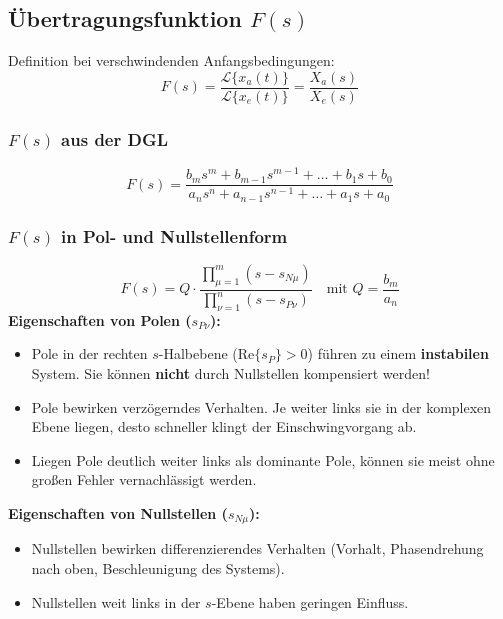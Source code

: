\subsection{Übertragungsfunktion $F(s)$}
\begin{tcolorbox}
Definition bei verschwindenden Anfangsbedingungen:
\[
F(s) = \frac{\mathcal{L}\{x_a(t)\}}{\mathcal{L}\{x_e(t)\}} = \frac{X_a(s)}{X_e(s)}
\]
\end{tcolorbox}

\subsubsection{$F(s)$ aus der DGL}
\begin{tcolorbox}
\[
F(s) = \frac{b_m s^m + b_{m-1} s^{m-1} + \dots + b_1 s + b_0}{a_n s^n + a_{n-1} s^{n-1} + \dots + a_1 s + a_0}
\]
\end{tcolorbox}

\subsubsection{$F(s)$ in Pol- und Nullstellenform}
\begin{tcolorbox}
\[
F(s) = Q \cdot \frac{\prod_{\mu=1}^m (s - s_{N\mu})}{\prod_{\nu=1}^n (s - s_{P\nu})} \quad \text{mit } Q = \frac{b_m}{a_n}
\]
\textbf{Eigenschaften von Polen ($s_{P\nu}$):}
\begin{itemize}
  \item Pole in der rechten $s$-Halbebene ($\text{Re}\{s_P\} > 0$) führen zu einem \textbf{instabilen} System. Sie können \textbf{nicht} durch Nullstellen kompensiert werden!
  \item Pole bewirken verzögerndes Verhalten. Je weiter links sie in der komplexen Ebene liegen, desto schneller klingt der Einschwingvorgang ab.
  \item Liegen Pole deutlich weiter links als dominante Pole, können sie meist ohne großen Fehler vernachlässigt werden.
\end{itemize}
\textbf{Eigenschaften von Nullstellen ($s_{N\mu}$):}
\begin{itemize}
  \item Nullstellen bewirken differenzierendes Verhalten (Vorhalt, Phasendrehung nach oben, Beschleunigung des Systems).
  \item Nullstellen weit links in der $s$-Ebene haben geringen Einfluss.
\end{itemize}
\end{tcolorbox}

